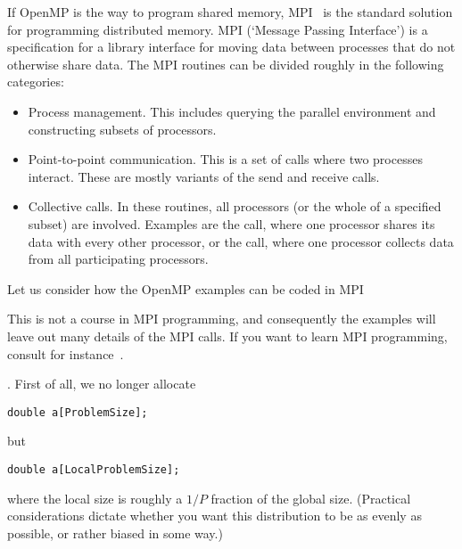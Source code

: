 
If OpenMP is the way to program shared memory,
\acf{MPI}~\cite{mpi-reference} is the standard solution for
programming distributed memory. MPI (`Message Passing Interface') is a
specification for a library interface for moving data
between processes that do
not otherwise share data. The MPI routines can be divided roughly in
the following categories:
\begin{itemize}
\item Process management. This includes querying the parallel
  environment and constructing subsets of processors.
\item Point-to-point communication. This is a set of calls where two processes
  interact. These are mostly variants of the send and receive calls.
\item{} Collective calls. In these
  routines, all processors (or the whole of a specified subset) are
  involved. Examples are the  call, where one
  processor shares its data with every other processor, or the
   call, where one processor collects data from all
  participating processors.
\end{itemize}

Let us consider how the OpenMP examples can be coded in
MPI
\begin{footnoteenv}
{This is not a course in MPI programming, and consequently
  the examples will leave out many details of the MPI calls. If you
  want to learn MPI programming, consult for
  instance~\cite{Gropp:UsingMPI1,Gropp:UsingMPI2,Gropp:UsingAdvancedMPI}.}
  \end{footnoteenv}%
  . First of all, we no longer allocate
\begin{verbatim}
double a[ProblemSize];
\end{verbatim}
but
\begin{verbatim}
double a[LocalProblemSize];
\end{verbatim}
where the local size is roughly a $1/P$ fraction of the global
size. (Practical considerations dictate whether you want this
distribution to be as evenly as possible, or rather biased in some
way.)

